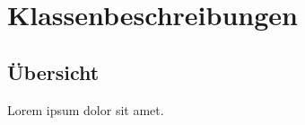 \section{Klassenbeschreibungen}

\subsection{Übersicht}

Lorem ipsum dolor sit amet.

\newpage


\setlength\parsep{0pt}
\setlength\parskip{0pt}

%

%


\setlength\parsep\oldparsep
\setlength\parskip\oldparskip

\newpage